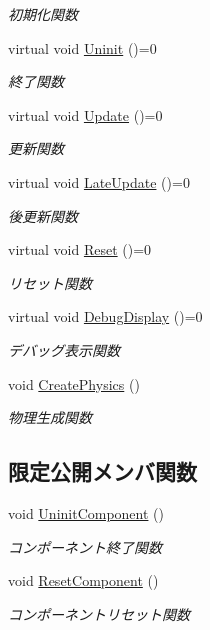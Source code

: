 \begin{DoxyCompactItemize}
\begin{DoxyCompactList}\small\item\em 初期化関数 \end{DoxyCompactList}\item 
virtual void \mbox{\hyperlink{class_game_object_base_a804828a399b4f76bb8c8a8d6727ebd97}{Uninit}} ()=0
\begin{DoxyCompactList}\small\item\em 終了関数 \end{DoxyCompactList}\item 
virtual void \mbox{\hyperlink{class_game_object_base_a287df113928cd40630fbb1e47a935831}{Update}} ()=0
\begin{DoxyCompactList}\small\item\em 更新関数 \end{DoxyCompactList}\item 
virtual void \mbox{\hyperlink{class_game_object_base_a4536510d363ce3ee4c911feaa8519821}{Late\+Update}} ()=0
\begin{DoxyCompactList}\small\item\em 後更新関数 \end{DoxyCompactList}\item 
virtual void \mbox{\hyperlink{class_game_object_base_a85c59554f734bcb09f1a1e18d9517dce}{Reset}} ()=0
\begin{DoxyCompactList}\small\item\em リセット関数 \end{DoxyCompactList}\item 
virtual void \mbox{\hyperlink{class_game_object_base_ac5dcc38beb0ce6d66bec6bb30ad9d168}{Debug\+Display}} ()=0
\begin{DoxyCompactList}\small\item\em デバッグ表示関数 \end{DoxyCompactList}\item 
void \mbox{\hyperlink{class_game_object_base_adf7df49baa04363c63f9515317776e40}{Create\+Physics}} ()
\begin{DoxyCompactList}\small\item\em 物理生成関数 \end{DoxyCompactList}\end{DoxyCompactItemize}
\subsection*{限定公開メンバ関数}
\begin{DoxyCompactItemize}
\item 
void \mbox{\hyperlink{class_game_object_base_aff8e4f486435f5d921c186b0824e8a0e}{Uninit\+Component}} ()
\begin{DoxyCompactList}\small\item\em コンポーネント終了関数 \end{DoxyCompactList}\item 
void \mbox{\hyperlink{class_game_object_base_ae68b93e50540bf41a81d88ca508b2b4d}{Reset\+Component}} ()
\begin{DoxyCompactList}\small\item\em コンポーネントリセット関数 \end{DoxyCompactList}\end{DoxyCompactItemize}
